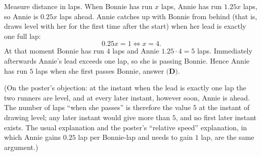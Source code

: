 Measure distance in laps. When Bonnie has run $x$ laps, Annie has run $1.25x$ laps, so Annie is $0.25x$ laps ahead. Annie catches up with Bonnie from behind (that is, draws level with her for the first time after the start) when her lead is exactly one full lap:
\[
0.25x=1\iff x=4 .
\]
At that moment Bonnie has run $4$ laps and Annie $1.25\cdot4=5$ laps. Immediately afterwards Annie's lead exceeds one lap, so she is passing Bonnie. Hence Annie has run $\boxed{5}$ laps when she first passes Bonnie, answer $\textbf{(D)}$.

(On the poster's objection: at the instant when the lead is exactly one lap the two runners are level, and at every later instant, however soon, Annie is ahead. The number of laps ``when she passes'' is therefore the value $5$ at the instant of drawing level; any later instant would give more than $5$, and no first later instant exists. The usual explanation and the poster's ``relative speed'' explanation, in which Annie gains $0.25$ lap per Bonnie-lap and needs to gain $1$ lap, are the same argument.)

